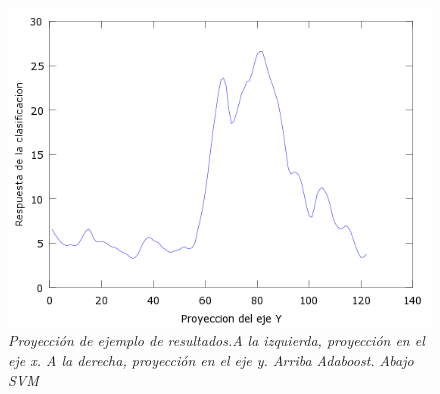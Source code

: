 \begin{figure}[htc]
  \includegraphics[scale=.4]{images/plots/svm4Y}
 \caption{\em  Proyección de ejemplo de resultados.A la izquierda, proyección en el eje x. A la derecha, proyección en el eje y. Arriba Adaboost. Abajo SVM}   
 \label{fig:pro4}
\end{figure}
